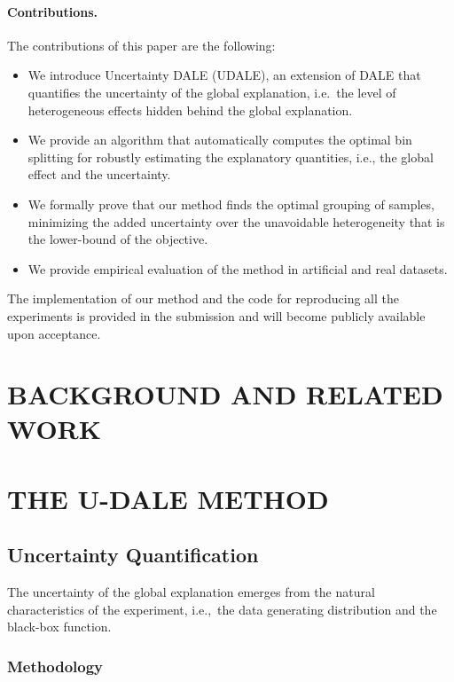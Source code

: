 \documentclass[twoside]{article}
\begin{document}
\paragraph{Contributions.} The contributions of this paper are the following:

\begin{itemize}
  \item We introduce Uncertainty DALE (UDALE), an extension of DALE that quantifies the uncertainty of the global explanation, i.e.~the level of heterogeneous effects hidden behind the global explanation.\item We provide an algorithm that automatically computes the optimal bin splitting for robustly estimating the explanatory quantities, i.e., the global effect and the uncertainty. 
  \item We formally prove that our method finds the optimal grouping of samples, minimizing the added uncertainty over the unavoidable heterogeneity that is the lower-bound of the objective.
  \item We provide empirical evaluation of the method in artificial and real datasets.
\end{itemize}


The implementation of our method and the code for reproducing all the
experiments is provided in the submission and will become publicly
available upon acceptance.


\section{BACKGROUND AND RELATED WORK}

\section{THE U-DALE METHOD}

\subsection{Uncertainty Quantification}

The uncertainty of the global explanation emerges from the natural characteristics of the experiment, i.e.,~the data generating distribution and the black-box function.

\subsubsection{Methodology}
\end{document}
